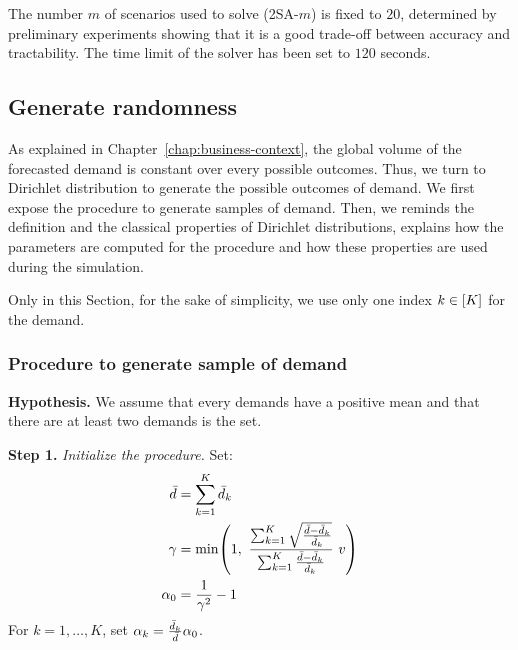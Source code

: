 The number $m$ of scenarios used to solve (2SA-$m$) is fixed to $20$, determined by preliminary experiments showing that it is a good trade-off between accuracy and tractability. The time limit of the solver has been set to $120$ seconds.



\subsection{Generate randomness}
\label{sec:PDP:numerical-experiments:dirichlet}


As explained in Chapter~\ref{chap:business-context}, the global volume of the forecasted demand is constant over every possible outcomes. Thus, we turn to Dirichlet distribution to generate the possible outcomes of demand. We first expose the procedure to generate samples of demand. Then, we reminds the definition and the classical properties of Dirichlet distributions, explains how the parameters are computed for the procedure and how these properties are used during the simulation.

Only in this Section, for the sake of simplicity, we use only one index $k\in\range{K}$ for the demand.



\subsubsection{Procedure to generate sample of demand}


\textbf{Hypothesis.} We assume that every demands have a positive mean and that there are at least two demands is the set.

\textbf{Step 1.} \emph{Initialize the procedure.}
Set:
\begin{subequations}
  \begin{align*}
    \bar{\demand} &= \sum_{k=1}^K\bar{\demand}_k
    \\
    \gamma &= \min \bracket{1,\
    \frac
    {\sum_{k=1}^K\sqrt{\frac{\bar{\demand}-\bar{\demand}_k}{\bar{\demand}_k}}}{\sum_{k=1}^K\frac{\bar{\demand}-\bar{\demand}_k}{\bar{\demand}_k}}\ v}
    \\
    \alpha_0 &= \frac{1}{\gamma^2}-1
  \end{align*}
\end{subequations}
For $k=1,\ldots,K$, set $\alpha_k=\frac{\bar{d}_k}{\bar{d}}\alpha_0$.

